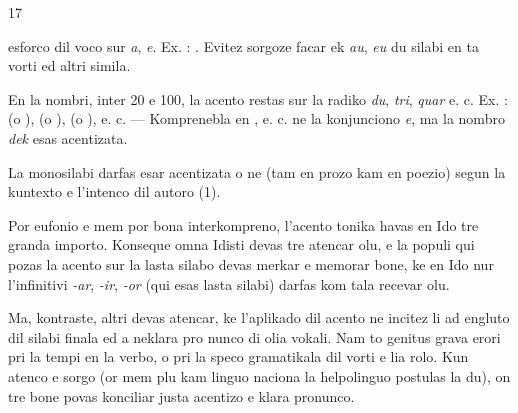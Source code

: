 \begin{VUpage}[21]{17}

\VUcontinue esforco dil voco sur \textit{a}, \textit{e}. Ex. : \nl
{}. Evitez sorgoze facar ek \textit{au}, \textit{eu} du silabi en ta vorti\nl
ed altri simila.

En la nombri, inter 20 e 100, la acento restas sur la\nl
radiko \textit{du}, \textit{tri}, \textit{quar} e. c. Ex. :  (o ), \nl
(o ),  (o ), e. c. --- Komprenebla en\nl
{}, e. c. ne la konjunciono \textit{e}, ma\nl
la nombro \textit{dek} esas acentizata.

La monosilabi darfas esar acentizata o ne (tam en prozo\nl
kam en poezio) segun la kuntexto e l'intenco dil autoro (1).

Por eufonio e mem por bona interkompreno, l'acento\nl
tonika havas en Ido tre granda importo. Konseque omna\nl
Idisti devas tre atencar olu, e la populi qui pozas la acento\nl
sur la lasta silabo devas merkar e memorar bone, ke en Ido\nl
nur l'infinitivi \textit{-ar}, \textit{-ir}, \textit{-or} (qui esas lasta silabi) darfas kom\nl
tala recevar olu.

Ma, kontraste, altri devas atencar, ke l'aplikado dil acento\nl
ne incitez li ad engluto dil silabi finala ed a neklara pro\cc
nunco di olia vokali. Nam to genitus grava erori pri la tempi\nl
en la verbo, o pri la speco gramatikala dil vorti e lia rolo.\nl
Kun atenco e sorgo (or mem plu kam linguo naciona la\nl
helpolinguo postulas la du), on tre bone povas konciliar\nl
justa acentizo e klara pronunco.


\end{VUpage}
